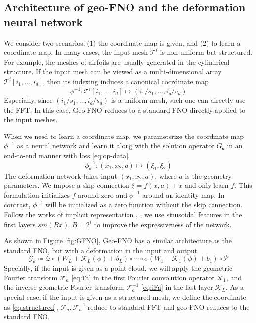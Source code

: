 \documentclass{article}
\newcommand{\cK}{\mathcal{K}}
\newcommand{\cP}{\mathcal{P}}
\newcommand{\cQ}{\mathcal{Q}}
\newcommand{\F}{\mathcal{F}}
\newcommand{\G}{\mathcal{G}}
\newcommand{\T}{\mathcal{T}}
\begin{document}
\subsection{Architecture of geo-FNO and the deformation neural network}
We consider two scenarios: (1) the coordinate map is given, and (2) to learn a coordinate map. In many cases, the input mesh $\T^i$ is non-uniform but structured. For example, the meshes of airfoils are usually generated in the cylindrical structure. If the input mesh can be viewed as a multi-dimensional array $\T^i[i_1,\ldots,i_d]$, then its indexing induces a canonical coordinate map 
\begin{equation}
\label{eq:structured}
\phi^{-1}: \T^i[i_1,\ldots,i_d] \mapsto (i_1/s_1,\ldots,i_d/s_d)    
\end{equation}
Especially, since $(i_1/s_1,\ldots,i_d/s_d)$ is a uniform mesh, such one can directly use the FFT. In this case, Geo-FNO reduces to a standard FNO directly applied to the input meshes.

When we need to learn a coordinate map, we parameterize the coordinate map $\phi^{-1}$ as a neural network and learn it along with the solution operator $G_\theta$ in an end-to-end manner with loss \eqref{eq:op-data}. 
\begin{equation}
\label{eq:mesh}
\phi_{\theta}^{-1}: (x_1,x_2,a) \mapsto (\xi_1, \xi_2)  
\end{equation}
The deformation network takes input $(x_1,x_2,a)$, where $a$ is the geometry parameters. We impose a skip connection $\xi = f(x,a) + x$ and only learn $f$. This formulation initializes  $f$ around zero and $\phi^{-1}$ around an identity map. In contrast, $\phi^{-1}$ will be initialized as a zero function without the skip connection.
Follow the works of implicit representation \citep{mildenhall2020nerf}, \citep{sitzmann2020implicit}, we use sinusoidal features in the first layers $sin(B x), B = 2^i$ to improve the expressiveness of the network. %

As shown in Figure \ref{fig:GFNO}, Geo-FNO has a similar architecture as the standard FNO, but with a deformation in the input and output
\begin{equation}
\label{eq:G}
    \G_{\theta} \coloneqq \cQ \circ(W_{L} + \cK_{L}(\phi) + b_L) \circ \cdots \circ \sigma(W_1 + \cK_1(\phi) + b_1) \circ \cP
\end{equation}
Specially, if the input is given as a point cloud, we will apply the geometric Fourier transform $ \F_a$ \eqref{eq:Fa} in the first Fourier convolution operator $\cK_1$, and the inverse geometric Fourier transform $\F^{-1}_a$ \eqref{eq:iFa} in the last layer $\cK_L$.
As a special case, if the input is given as a structured mesh, we define the coordinate as \eqref{eq:structured}, $\F_a, \F^{-1}_a$ reduce to standard FFT and geo-FNO reduces to the standard FNO.
\end{document}
